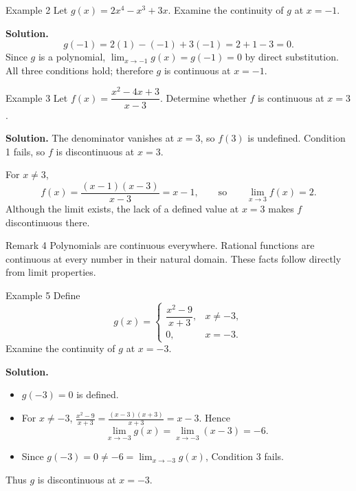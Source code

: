 \begin{examplebox}{Example 2}
Let \(g(x) = 2x^{4} - x^{3} + 3x\). Examine the continuity of \(g\) at \(x = -1\).

\medskip
\textbf{Solution.}
\[
g(-1) = 2(1) - (-1) + 3(-1) = 2 + 1 - 3 = 0.
\]
Since \(g\) is a polynomial, \(\displaystyle\lim_{x \to -1} g(x) = g(-1) = 0\) by direct substitution. All three conditions hold; therefore \(g\) is continuous at \(x = -1\).
\end{examplebox}

\begin{examplebox}{Example 3}
Let \(f(x) = \dfrac{x^{2} - 4x + 3}{x - 3}\). Determine whether \(f\) is continuous at \(x = 3\).

\medskip
\textbf{Solution.}
The denominator vanishes at \(x = 3\), so \(f(3)\) is undefined. Condition 1 fails, so \(f\) is discontinuous at \(x = 3\).

For \(x \neq 3\),
\[
f(x) = \frac{(x - 1)(x - 3)}{x - 3} = x - 1,
\qquad\text{so}\qquad
\lim_{x \to 3} f(x) = 2.
\]
Although the limit exists, the lack of a defined value at \(x = 3\) makes \(f\) discontinuous there.
\end{examplebox}

\begin{remarkbox}{Remark 4}
Polynomials are continuous everywhere. Rational functions are continuous at every number in their natural domain. These facts follow directly from limit properties.
\end{remarkbox}

\begin{examplebox}{Example 5}
Define
\[
g(x) = \begin{cases}
\dfrac{x^{2} - 9}{x + 3}, & x \neq -3, \\[8pt]
0, & x = -3.
\end{cases}
\]
Examine the continuity of \(g\) at \(x = -3\).

\medskip
\textbf{Solution.}
\begin{itemize}
    \item \(g(-3) = 0\) is defined.
    \item For \(x \neq -3\), \(\displaystyle\frac{x^{2} - 9}{x + 3} = \frac{(x - 3)(x + 3)}{x + 3} = x - 3\). Hence
    \[
    \lim_{x \to -3} g(x) = \lim_{x \to -3} (x - 3) = -6.
    \]
    \item Since \(g(-3) = 0 \neq -6 = \displaystyle\lim_{x \to -3} g(x)\), Condition 3 fails.
\end{itemize}
Thus \(g\) is discontinuous at \(x = -3\).
\end{examplebox}

